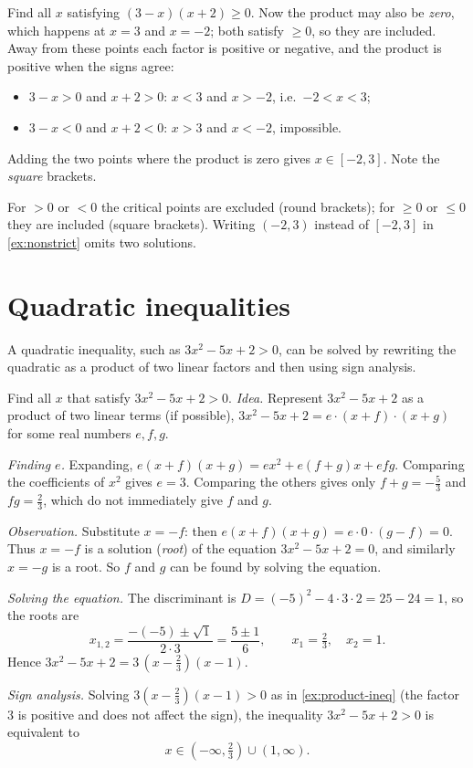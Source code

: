 \begin{example}
Find all $x$ satisfying $(3-x)(x+2)\ge0$. 
\solution
Now the product may also be \emph{zero}, which happens at $x=3$ and $x=-2$; both satisfy $\ge0$, so they are
included. Away from these points each factor is positive or negative, and the product is positive when the signs
agree:
\begin{itemize}
  \item $3-x>0$ and $x+2>0$: $x<3$ and $x>-2$, i.e.\ $-2<x<3$;
  \item $3-x<0$ and $x+2<0$: $x>3$ and $x<-2$, impossible.
\end{itemize}
Adding the two points where the product is zero gives $x\in[-2,3]$. Note the \emph{square} brackets.
\end{example}

\begin{warning}
For $>0$ or $<0$ the critical points are excluded (round brackets); for $\ge0$ or $\le0$ they are included
(square brackets). Writing $(-2,3)$ instead of $[-2,3]$ in \cref{ex:nonstrict} omits two solutions.
\end{warning}

\section{Quadratic inequalities}\label{sec:quadratic}

A quadratic inequality, such as $3x^2-5x+2>0$, can be solved by rewriting the quadratic as a product of two
linear factors and then using sign analysis.

\begin{example}
Find all $x$ that satisfy $3x^2-5x+2>0$. 
\solution
\emph{Idea.} Represent $3x^2-5x+2$ as a product of two linear terms (if possible),
$3x^2-5x+2=e\cdot(x+f)\cdot(x+g)$ for some real numbers $e,f,g$.

\emph{Finding $e$.} Expanding, $e(x+f)(x+g)=ex^2+e(f+g)x+efg$. Comparing the coefficients of $x^2$ gives $e=3$.
Comparing the others gives only $f+g=-\tfrac53$ and $fg=\tfrac23$, which do not immediately give $f$ and $g$.

\emph{Observation.} Substitute $x=-f$: then $e(x+f)(x+g)=e\cdot0\cdot(g-f)=0$. Thus $x=-f$ is a solution
(\emph{root}) of the equation $3x^2-5x+2=0$, and similarly $x=-g$ is a root. So $f$ and $g$ can be found by
solving the equation.

\emph{Solving the equation.} The discriminant is $D=(-5)^2-4\cdot3\cdot2=25-24=1$, so the roots are
\[
x_{1,2}=\frac{-(-5)\pm\sqrt1}{2\cdot 3}=\frac{5\pm1}{6},\qquad x_1=\tfrac23,\quad x_2=1.
\]
Hence $3x^2-5x+2=3\,(x-\tfrac23)(x-1)$.

\emph{Sign analysis.} Solving $3(x-\tfrac23)(x-1)>0$ as in \cref{ex:product-ineq} (the factor $3$ is positive and
does not affect the sign), the inequality $3x^2-5x+2>0$ is equivalent to
\[
x\in(-\infty,\tfrac23)\cup(1,\infty).
\]
\end{example}

